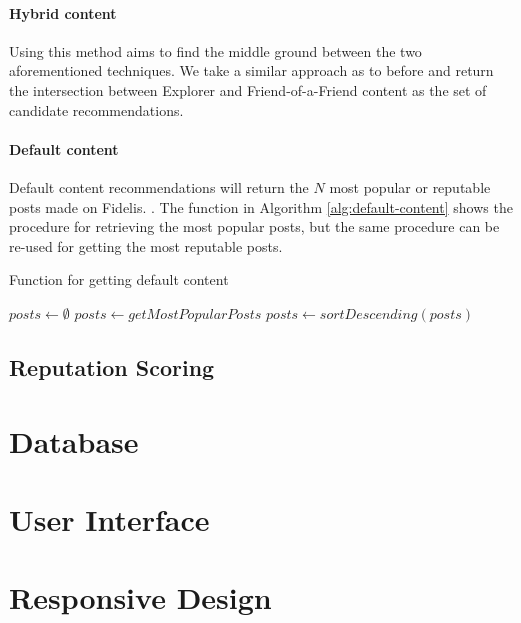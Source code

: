 \paragraph{Hybrid content} Using this method aims to find the middle ground between the two aforementioned techniques. We take a similar approach as to before and return the intersection between Explorer and Friend-of-a-Friend content as the set of candidate recommendations.

\paragraph{Default content} Default content recommendations will return the $N$ most popular or reputable posts made on Fidelis. . The function in Algorithm \ref{alg:default-content} shows the procedure for retrieving the most popular posts, but the same procedure can be re-used for getting the most reputable posts.

\begin{algorithm}
\caption{Function for getting default content}
\label{alg:default-content}
\begin{algorithmic}[1]
	\State $posts\gets \emptyset$
	\State $posts\gets getMostPopularPosts$
	\State $posts\gets sortDescending(posts)$
	\State {}
\EndFunction
\end{algorithmic}
\end{algorithm}

\subsection{Reputation Scoring}

\section{Database}

\section{User Interface}

\section{Responsive Design}